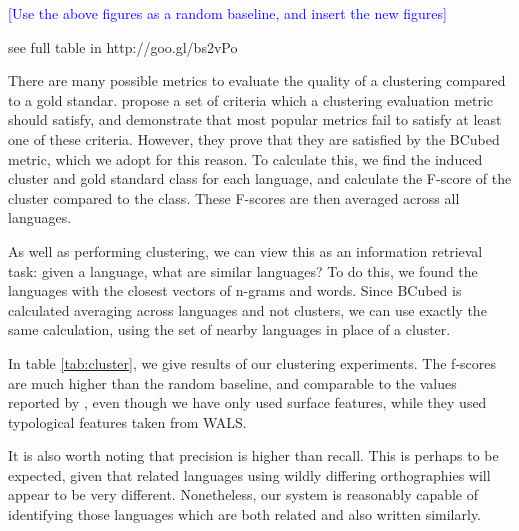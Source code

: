 \textcolor{blue}{[Use the above figures as a random baseline, and insert the new figures]}


\noindent
see full table in http://goo.gl/bs2vPo





There are many possible metrics to evaluate the quality of a clustering compared to a gold standar.  propose a set of criteria which a clustering evaluation metric should satisfy, and demonstrate that most popular metrics fail to satisfy at least one of these criteria.  However, they prove that they are satisfied by the BCubed metric, which we adopt for this reason.  To calculate this, we find the induced cluster and gold standard class for each language, and calculate the F-score of the cluster compared to the class.  These F-scores are then averaged across all languages.

As well as performing clustering, we can view this as an information retrieval task: given a language, what are similar languages?  To do this, we found the languages with the closest vectors of n-grams and words.  Since BCubed is calculated averaging across languages and not clusters, we can use exactly the same calculation, using the set of nearby languages in place of a cluster.

In table \ref{tab:cluster}, we give results of our clustering experiments.  The f-scores are much higher than the random baseline, and comparable to the values reported by , even though we have only used surface features, while they used typological features taken from WALS.

It is also worth noting that precision is higher than recall.  This is perhaps to be expected, given that related languages using wildly differing orthographies will appear to be very different.  Nonetheless, our system is reasonably capable of identifying those languages which are both related and also written similarly.
